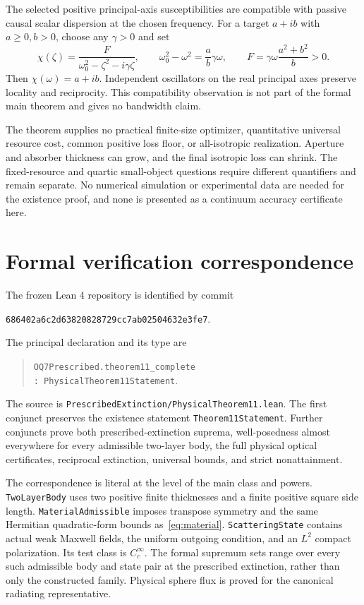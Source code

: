 \documentclass[11pt]{article}
\begin{document}
The selected positive principal-axis susceptibilities are compatible with passive causal scalar dispersion at the chosen frequency. For a target $a+ib$ with $a\geq0,b>0$, choose any $\gamma>0$ and set
\begin{equation}\label{eq:lorentz}
 \chi(\zeta)=\frac{F}{\omega_0^2-\zeta^2-i\gamma\zeta},\qquad
 \omega_0^2-\omega^2=\frac{a}{b}\gamma\omega,\qquad
 F=\gamma\omega\frac{a^2+b^2}{b}>0.
\end{equation}
Then $\chi(\omega)=a+ib$. Independent oscillators on the real principal axes preserve locality and reciprocity. This compatibility observation is not part of the formal main theorem and gives no bandwidth claim.

The theorem supplies no practical finite-size optimizer, quantitative universal resource cost, common positive loss floor, or all-isotropic realization. Aperture and absorber thickness can grow, and the final isotropic loss can shrink. The fixed-resource and quartic small-object questions require different quantifiers and remain separate. No numerical simulation or experimental data are needed for the existence proof, and none is presented as a continuum accuracy certificate here.

\section{Formal verification correspondence}\label{sec:formal}
The frozen Lean 4 repository is identified by commit
\begin{center}\small\texttt{686402a6c2d63820828729cc7ab02504632e3fe7}.\end{center}
The principal declaration and its type are
\begin{quote}
\texttt{OQ7Prescribed.theorem11\_complete}\\
\texttt{: PhysicalTheorem11Statement}.
\end{quote}
The source is \texttt{PrescribedExtinction/PhysicalTheorem11.lean}. The first conjunct preserves the existence statement \texttt{Theorem11Statement}. Further conjuncts prove both prescribed-extinction suprema, well-posedness almost everywhere for every admissible two-layer body, the full physical optical certificates, reciprocal extinction, universal bounds, and strict nonattainment.

The correspondence is literal at the level of the main class and powers. \texttt{TwoLayerBody} uses two positive finite thicknesses and a finite positive square side length. \texttt{MaterialAdmissible} imposes transpose symmetry and the same Hermitian quadratic-form bounds as~\eqref{eq:material}. \texttt{ScatteringState} contains actual weak Maxwell fields, the uniform outgoing condition, and an $L^2$ compact polarization. Its test class is $C_c^\infty$. The formal supremum sets range over every such admissible body and state pair at the prescribed extinction, rather than only the constructed family. Physical sphere flux is proved for the canonical radiating representative.
\end{document}
